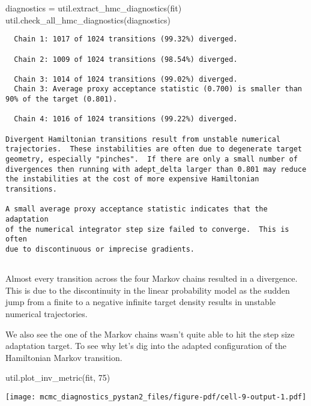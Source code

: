 \documentclass[
  letterpaper,
  DIV=11,
  numbers=noendperiod]{scrartcl}
\newenvironment{Shaded}{\begin{snugshade}}{\end{snugshade}}
\newcommand{\DecValTok}[1]{\textcolor[rgb]{0.68,0.00,0.00}{#1}}
\newcommand{\NormalTok}[1]{\textcolor[rgb]{0.00,0.23,0.31}{#1}}
\newcommand{\OperatorTok}[1]{\textcolor[rgb]{0.37,0.37,0.37}{#1}}
\begin{document}
\begin{Shaded}
\begin{Highlighting}[]
\NormalTok{diagnostics }\OperatorTok{=}\NormalTok{ util.extract\_hmc\_diagnostics(fit)}
\NormalTok{util.check\_all\_hmc\_diagnostics(diagnostics)}
\end{Highlighting}
\end{Shaded}

\begin{verbatim}
  Chain 1: 1017 of 1024 transitions (99.32%) diverged.
 
  Chain 2: 1009 of 1024 transitions (98.54%) diverged.
 
  Chain 3: 1014 of 1024 transitions (99.02%) diverged.
  Chain 3: Average proxy acceptance statistic (0.700) is smaller than
90% of the target (0.801).
 
  Chain 4: 1016 of 1024 transitions (99.22%) diverged.
 
Divergent Hamiltonian transitions result from unstable numerical
trajectories.  These instabilities are often due to degenerate target
geometry, especially "pinches".  If there are only a small number of
divergences then running with adept_delta larger than 0.801 may reduce
the instabilities at the cost of more expensive Hamiltonian transitions.
 
A small average proxy acceptance statistic indicates that the adaptation
of the numerical integrator step size failed to converge.  This is often
due to discontinuous or imprecise gradients.
 
\end{verbatim}

Almost every transition across the four Markov chains resulted in a
divergence. This is due to the discontinuity in the linear probability
model as the sudden jump from a finite to a negative infinite target
density results in unstable numerical trajectories.

We also see the one of the Markov chains wasn't quite able to hit the
step size adaptation target. To see why let's dig into the adapted
configuration of the Hamiltonian Markov transition.

\begin{Shaded}
\begin{Highlighting}[]
\NormalTok{util.plot\_inv\_metric(fit, }\DecValTok{75}\NormalTok{)}
\end{Highlighting}
\end{Shaded}

\texttt{[image: mcmc\_diagnostics\_pystan2\_files/figure-pdf/cell-9-output-1.pdf]}
\end{document}
